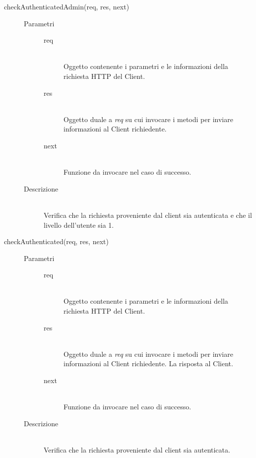 \begin{description}
\begin{description}
     \item[checkAuthenticatedAdmin(req, res, next)] \hfill 
          \begin{description}
            \item[Parametri] \hfill
            \begin{description}
             \item[req] \hfill \\
	         Oggetto contenente i parametri e le informazioni della richiesta HTTP del Client.
	         \item[res] \hfill \\
	         Oggetto duale a \textit{req} su cui invocare i metodi per inviare informazioni al Client richiedente.
             \item[next] \hfill \\
             Funzione da invocare nel caso di successo.
            \end{description}
            \item[Descrizione] \hfill \\
            Verifica che la richiesta proveniente dal client sia autenticata e che il livello dell'utente sia 1. 
         \end{description}
     \item[checkAuthenticated(req, res, next)] \hfill 
     \begin{description}
      \item[Parametri] \hfill
      \begin{description}
       \item[req] \hfill \\
	    Oggetto contenente i parametri e le informazioni della richiesta HTTP del Client.
	    \item[res] \hfill \\
	    Oggetto duale a \textit{req} su cui invocare i metodi per inviare informazioni al Client richiedente.
        La risposta al Client.
       \item[next] \hfill \\
        Funzione da invocare nel caso di successo.
      \end{description}
      \item[Descrizione] \hfill \\
      Verifica che la richiesta proveniente dal client sia autenticata.
     \end{description}
     

\end{description}
\end{description}
